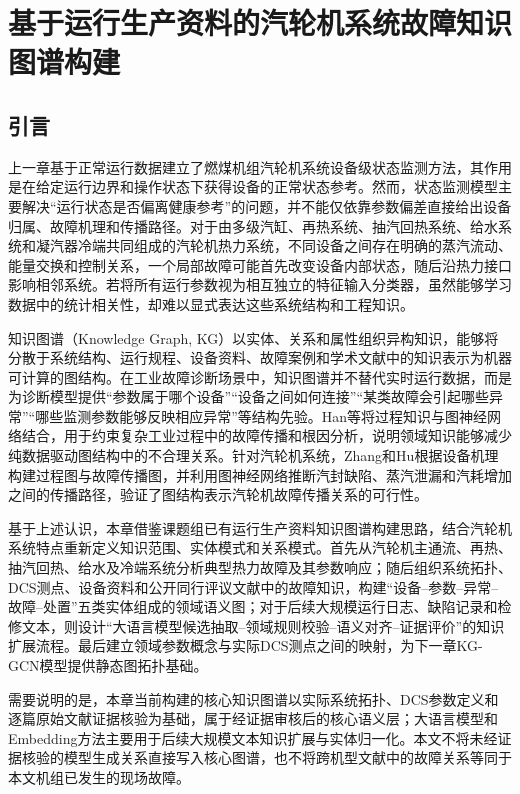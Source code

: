 \section{基于运行生产资料的汽轮机系统故障知识图谱构建}
\label{sec:knowledge_graph_v2}

\subsection{引言}

上一章基于正常运行数据建立了燃煤机组汽轮机系统设备级状态监测方法，其作用是在给定运行边界和操作状态下获得设备的正常状态参考。然而，状态监测模型主要解决“运行状态是否偏离健康参考”的问题，并不能仅依靠参数偏差直接给出设备归属、故障机理和传播路径。对于由多级汽缸、再热系统、抽汽回热系统、给水系统和凝汽器冷端共同组成的汽轮机热力系统，不同设备之间存在明确的蒸汽流动、能量交换和控制关系，一个局部故障可能首先改变设备内部状态，随后沿热力接口影响相邻系统。若将所有运行参数视为相互独立的特征输入分类器，虽然能够学习数据中的统计相关性，却难以显式表达这些系统结构和工程知识。

知识图谱（Knowledge Graph, KG）以实体、关系和属性组织异构知识，能够将分散于系统结构、运行规程、设备资料、故障案例和学术文献中的知识表示为机器可计算的图结构\cite{Hogan2021KnowledgeGraphs}。在工业故障诊断场景中，知识图谱并不替代实时运行数据，而是为诊断模型提供“参数属于哪个设备”“设备之间如何连接”“某类故障会引起哪些异常”“哪些监测参数能够反映相应异常”等结构先验。Han等将过程知识与图神经网络结合，用于约束复杂工业过程中的故障传播和根因分析，说明领域知识能够减少纯数据驱动图结构中的不合理关系\cite{Han2022KnowledgeEnhancedGNN}。针对汽轮机系统，Zhang和Hu根据设备机理构建过程图与故障传播图，并利用图神经网络推断汽封缺陷、蒸汽泄漏和汽耗增加之间的传播路径，验证了图结构表示汽轮机故障传播关系的可行性\cite{ZhangHu2021FaultPropagationGNN}。

基于上述认识，本章借鉴课题组已有运行生产资料知识图谱构建思路\cite{YangHaodong2026CFB}，结合汽轮机系统特点重新定义知识范围、实体模式和关系模式。首先从汽轮机主通流、再热、抽汽回热、给水及冷端系统分析典型热力故障及其参数响应；随后组织系统拓扑、DCS测点、设备资料和公开同行评议文献中的故障知识，构建“设备--参数--异常--故障--处置”五类实体组成的领域语义图；对于后续大规模运行日志、缺陷记录和检修文本，则设计“大语言模型候选抽取--领域规则校验--语义对齐--证据评价”的知识扩展流程。最后建立领域参数概念与实际DCS测点之间的映射，为下一章KG-GCN模型提供静态图拓扑基础。

需要说明的是，本章当前构建的核心知识图谱以实际系统拓扑、DCS参数定义和逐篇原始文献证据核验为基础，属于经证据审核后的核心语义层；大语言模型和Embedding方法主要用于后续大规模文本知识扩展与实体归一化。本文不将未经证据核验的模型生成关系直接写入核心图谱，也不将跨机型文献中的故障关系等同于本文机组已发生的现场故障。

